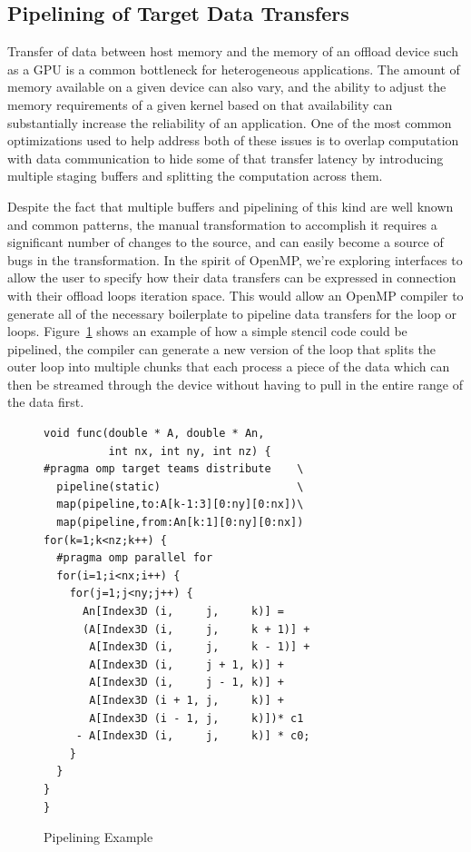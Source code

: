 \subsection{Pipelining of Target Data Transfers}
\label{sub:pipelining}

Transfer of data between host memory and the memory of an offload device such as
a GPU is a common bottleneck for heterogeneous applications.  The amount of
memory available on a given device can also vary, and the ability to adjust the
memory requirements of a given kernel based on that availability can
substantially increase the reliability of an application.  One of the most
common optimizations used to help address both of these issues is to overlap
computation with data communication to hide some of that transfer latency by
introducing multiple staging buffers and splitting the computation across them.  

Despite the fact that multiple buffers and pipelining of this kind are well
known and common patterns, the manual transformation to accomplish it requires a
significant number of changes to the source, and can easily become a source of
bugs in the transformation.  In the spirit of OpenMP, we're exploring interfaces
to allow the user to specify how their data transfers can be expressed in
connection with their offload loops iteration space.  This would allow an OpenMP
compiler to generate all of the necessary boilerplate to pipeline data transfers
for the loop or loops.  Figure~\ref{fig:pipeline} shows an example of how a
simple stencil code could be pipelined, the compiler can generate a new version
of the loop that splits the outer loop into multiple chunks that each process a
piece of the data which can then be streamed through the device without having
to pull in the entire range of the data first.

\begin{figure}
\begin{verbatim}
void func(double * A, double * An,
          int nx, int ny, int nz) {
#pragma omp target teams distribute    \
  pipeline(static)                     \
  map(pipeline,to:A[k-1:3][0:ny][0:nx])\
  map(pipeline,from:An[k:1][0:ny][0:nx])
for(k=1;k<nz;k++) {
  #pragma omp parallel for
  for(i=1;i<nx;i++) {
    for(j=1;j<ny;j++) {
      An[Index3D (i,     j,     k)] =
      (A[Index3D (i,     j,     k + 1)] +
       A[Index3D (i,     j,     k - 1)] +
       A[Index3D (i,     j + 1, k)] +
       A[Index3D (i,     j - 1, k)] +
       A[Index3D (i + 1, j,     k)] +
       A[Index3D (i - 1, j,     k)])* c1
     - A[Index3D (i,     j,     k)] * c0;
    }
  } 
}
}
\end{verbatim}
\caption{Pipelining Example\label{fig:pipeline}}
\end{figure}

